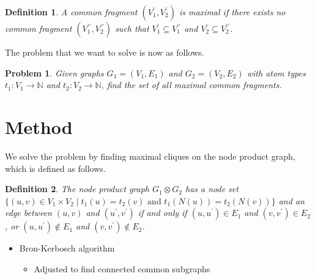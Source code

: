 \documentclass[11pt]{article}
\newtheorem{problem}{Problem}[section]
\newtheorem{definition}{Definition}[section]
\begin{document}
\begin{definition}
A common fragment $(V^\prime_1,V^\prime_2)$ is \emph{maximal} if
there exists no common fragment $(V^{\prime\prime}_1,V^{\prime\prime}_2)$ such
that $V^\prime_1 \subseteq V^{\prime\prime}_1$ and $V^\prime_2 \subseteq
V^{\prime\prime}_2$.
\end{definition}

The problem that we want to solve is now as follows.

\begin{problem}
Given graphs $G_1 = (V_1, E_1)$ and $G_2 = (V_2, E_2)$ with atom types $t_1 :
V_1 \rightarrow \mathbb{N}$ and $t_2 : V_2 \rightarrow \mathbb{N}$, find the
set of all maximal common fragments.
\end{problem}

\section{Method}

We solve the problem by finding maximal cliques on the node product graph, which
is defined as follows.

\begin{definition}
The \emph{node product graph} $G_1 \otimes G_2$ has a node set $\{(u,v) \in V_1
\times V_2 \mid t_1(u) = t_2(v) \mbox{ and } t_1(N(u)) = t_2(N(v)) \}$ and an
edge between $(u,v)$ and $(u^\prime,v^\prime)$ if and only if $(u,u^\prime) \in
E_1$ and $(v,v^\prime) \in E_2$, or $(u,u^\prime) \not \in E_1$ and
$(v,v^\prime) \not \in E_2$.
\end{definition}

\begin{itemize}
  \item Bron-Kerbosch algorithm
  \begin{itemize}
    \item Adjusted to find connected common subgraphs~\cite{Koch:1996fc,Koch:2001wi}
  \end{itemize}
\end{itemize}



\end{document}
